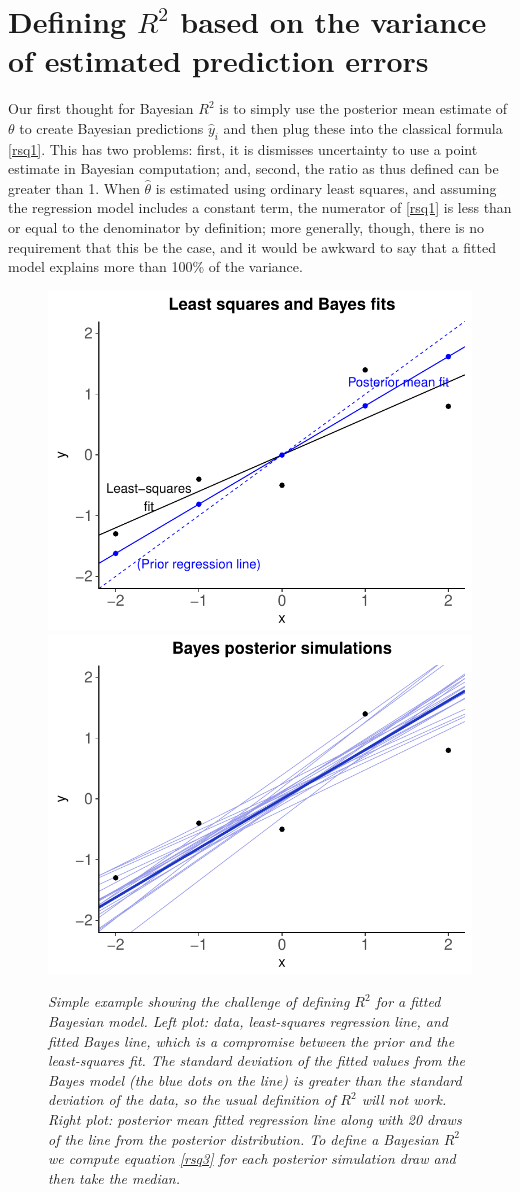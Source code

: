 \documentclass[11pt]{article}
\begin{document}
\section{Defining $R^2$ based on the variance of estimated prediction errors}

Our first thought for Bayesian $R^2$ is to simply use the posterior mean
estimate of $\theta$ to create Bayesian predictions $\hat{y}_i$ and then plug
these into the classical formula \eqref{rsq1}.  This has two problems:  first,
it is dismisses uncertainty to use a point estimate in Bayesian computation;
and, second, the ratio as thus defined can be greater than 1.  When
$\hat{\theta}$ is estimated using ordinary least squares, and assuming the
regression model includes a constant term, the numerator of \eqref{rsq1} is less
than or equal to the denominator by definition; more generally, though, there is
no requirement that this be the case, and it would be awkward to say that a
fitted model explains more than 100\% of the variance.

\begin{figure}
\centerline{\includegraphics[width=.5\textwidth]{fig/rsquared1a-gg.pdf}\includegraphics[width=.5\textwidth]{fig/rsquared1b-gg.pdf}}
\vspace{-.1in}
\caption{\em Simple example showing the challenge of defining $R^2$ for a fitted
Bayesian model.  {\em Left plot:}  data, least-squares regression line, and
fitted Bayes line, which is a compromise between the prior and the least-squares
fit.  The standard deviation of the fitted values from the Bayes model (the blue
dots on the line) is greater than the standard deviation of the data, so the
usual definition of $R^2$ will not work.  {\em Right plot:}  posterior mean
fitted regression line along with 20 draws of the line from the posterior
distribution.  To define a Bayesian $R^2$ we compute equation 
\eqref{rsq3} for each posterior simulation draw and then take the median.}
\label{rsquared1}
\end{figure}
\end{document}
